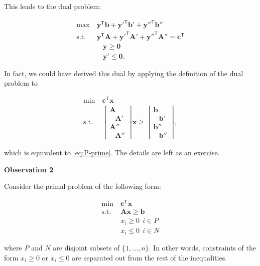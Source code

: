 \documentclass[]{book}
\newcommand{\T}{\mathsf{T}}
\newcommand{\mm}[1]{\mathbf{#1}}
\renewcommand{\vec}[1]{\mathbf{#1}}
\theoremstyle{definition}
\theoremstyle{definition}
\theoremstyle{remark}
\begin{document}
This leads to the dual problem:

\begin{equation}
\begin{array}{rl}
\max~ & \vec{y}^\T\vec{b} 
+\vec{y'}^\T\vec{b'}
+\vec{y''}^\T\vec{b''} \\
\mbox{s.t.} ~
& \vec{y}^\T\mm{A}
+\vec{y'}^\T\mm{A'}
+\vec{y''}^\T\mm{A''} = \vec{c}^\T \\
&~~~~\vec{y} \geq \vec{0} \\
&~~~~\vec{y'} \leq \vec{0}.
\end{array} \label{eq:D-prime}
\end{equation}

In fact, we could have derived this dual by applying the definition of
the dual problem to

\begin{equation*}
\begin{array}{rl}
\min ~& \vec{c}^\T\vec{x} \\
\mbox{s.t.}  ~
& \begin{bmatrix} 
 \mm{A} \\
 -\mm{A'} \\
 \mm{A''} \\
 -\mm{A''}
\end{bmatrix} \vec{x}
\geq
\begin{bmatrix}
\vec{b} \\
-\vec{b'} \\
\vec{b''} \\
-\vec{b''}
\end{bmatrix},
\end{array}
\end{equation*}

which is equivalent to \eqref{eq:P-prime}. The details are left as an
exercise.

\textbf{Observation 2}

Consider the primal problem of the following form:

\begin{equation}
\begin{array}{rl}
\min ~& \vec{c}^\T\vec{x} \\
\mbox{s.t.} ~& \mm{A}\vec{x} \geq \vec{b} \\
 & x_i \geq 0 ~~i \in P \\
 & x_i \leq 0 ~~i \in N 
\end{array}\label{eq:P-dbl-prime}
\end{equation}

where \(P\) and \(N\) are disjoint subsets of \(\{1,\ldots,n\}\). In
other words, constraints of the form \(x_i \geq 0\) or \(x_i \leq 0\)
are separated out from the rest of the inequalities.
\end{document}
